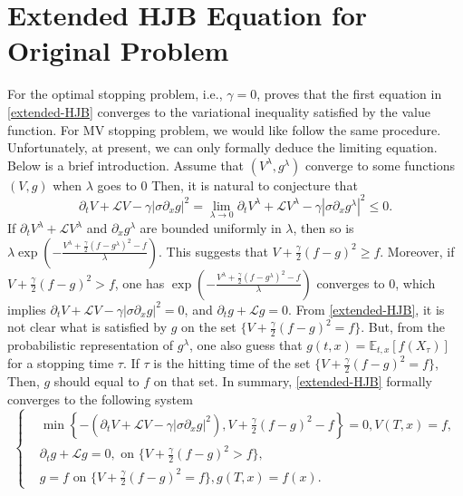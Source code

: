 \documentclass[11pt]{article}
\begin{document}
\section{Extended HJB Equation for Original Problem}
For the optimal stopping problem, i.e., $\gamma=0$,  \cite{dong2024randomized} proves that the first equation in \eqref{extended-HJB} converges to the variational inequality satisfied by the value function.  For  MV stopping problem, we would like follow the same procedure.  Unfortunately, at present, we can only formally deduce  the limiting equation. Below is a brief introduction. Assume that 
$(V^\lambda,g^\lambda)$ converge to some functions $(V,g)$ when $\lambda$ goes to $0$ Then, it is natural to conjecture  that  
$$\partial_t V+\mathcal LV-\gamma\left|\sigma\partial_x g \right|^2=\lim_{\lambda \rightarrow 0}\partial_t V^\lambda+\mathcal LV^\lambda-\gamma\left|\sigma\partial_x g^\lambda \right|^2\le 0.
$$
If $\partial_t V^\lambda+\mathcal LV^\lambda$ and $\partial_x g^\lambda$ are bounded uniformly in $\lambda$, then  so is $\lambda\exp(-\frac{V^\lambda+\frac{\gamma}{2}(f-g^\lambda)^2-f}{\lambda})$. This suggests that $V+\frac\gamma2(f-g)^2 \ge f$. Moreover, if $V+\frac\gamma2(f-g)^2 > f$, one has $\exp(-\frac{V^\lambda+\frac{\gamma}{2}(f-g^\lambda)^2-f}{\lambda})$ converges to $0$, which implies   $\partial_t V+\mathcal LV-\gamma\left|\sigma\partial_x g \right|^2=0$, and $\partial_t g+\mathcal Lg=0$. From \eqref{extended-HJB}, it is not clear what is satisfied by $g$ on the set $\{V+\frac\gamma2(f-g)^2=f\}$. But, from the probabilistic representation of $g^\lambda$, one also guess that $g(t,x)=\mathbb E_{t,x}[f(X_\tau)]$ for a stopping time $\tau$. If $\tau$ is the hitting time of the set $\{V+\frac\gamma2(f-g)^2=f\}$, Then, $g$ should equal to $f$ on that set.  In summary, \eqref{extended-HJB} formally converges to the following system
\begin{equation}\label{extended_VI}
\left\{
\begin{split}
&\min\left \{-\left(\partial_t V+\mathcal LV-\gamma\left|\sigma\partial_x g \right|^2\right),V+\frac{\gamma}{2}(f-g)^2-f\right\}=0,V(T,x)=f,\\
& \partial_t g+\mathcal Lg=0, \text{ on $\{V+\frac{\gamma}{2}(f-g)^2 >f\}$},\\
&g=f \text{ on $\{V+\frac{\gamma}{2}(f-g)^2 =f\}$}, g(T,x)=f(x).
\end{split}
\right.
\end{equation}
\end{document}
